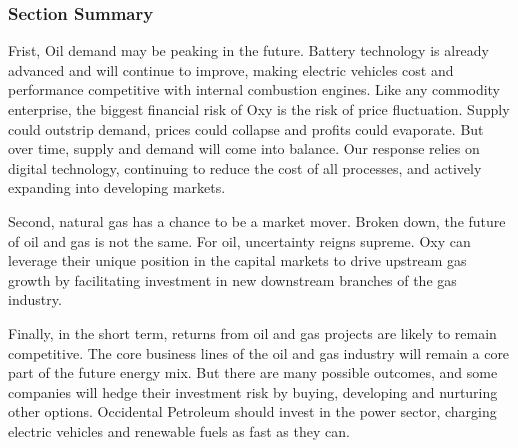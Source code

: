\documentclass[
	a4paper, %
	12pt,%
]{CSSullivanBusinessReport}
\begin{document}
\begin{fullwidth}
\subsubsection{Section Summary}
Frist, Oil demand may be peaking in the future. Battery technology is already advanced and will continue to improve, making electric vehicles cost and performance competitive with internal combustion engines. Like any commodity enterprise, the biggest financial risk of Oxy is the risk of price fluctuation. Supply could outstrip demand, prices could collapse and profits could evaporate. But over time, supply and demand will come into balance. Our response relies on digital technology, continuing to reduce the cost of all processes, and actively expanding into developing markets.
\par
Second, natural gas has a chance to be a market mover. Broken down, the future of oil and gas is not the same. For oil, uncertainty reigns supreme. Oxy can leverage their unique position in the capital markets to drive upstream gas growth by facilitating investment in new downstream branches of the gas industry.
\par
Finally, in the short term, returns from oil and gas projects are likely to remain competitive. The core business lines of the oil and gas industry will remain a core part of the future energy mix. But there are many possible outcomes, and some companies will hedge their investment risk by buying, developing and nurturing other options. Occidental Petroleum should invest in the power sector, charging electric vehicles and renewable fuels as fast as they can.


\end{fullwidth}
\end{document}
